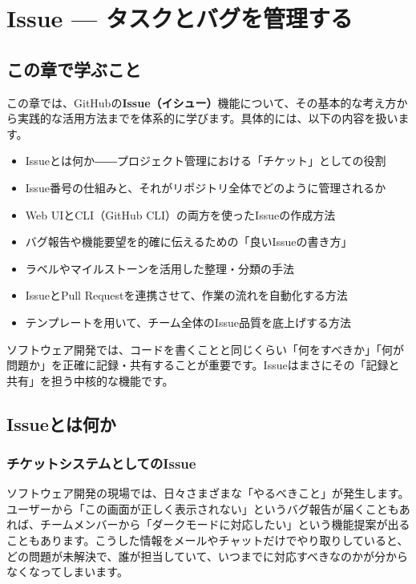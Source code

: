 \chapter{Issue --- タスクとバグを管理する}

\section{この章で学ぶこと}

この章では、GitHubの\textbf{Issue（イシュー）}機能について、その基本的な考え方から実践的な活用方法までを体系的に学びます。具体的には、以下の内容を扱います。

\begin{itemize}
  \item Issueとは何か――プロジェクト管理における「チケット」としての役割
  \item Issue番号の仕組みと、それがリポジトリ全体でどのように管理されるか
  \item Web UIとCLI（GitHub CLI）の両方を使ったIssueの作成方法
  \item バグ報告や機能要望を的確に伝えるための「良いIssueの書き方」
  \item ラベルやマイルストーンを活用した整理・分類の手法
  \item IssueとPull Requestを連携させて、作業の流れを自動化する方法
  \item テンプレートを用いて、チーム全体のIssue品質を底上げする方法
\end{itemize}

ソフトウェア開発では、コードを書くことと同じくらい「何をすべきか」「何が問題か」を正確に記録・共有することが重要です。Issueはまさにその「記録と共有」を担う中核的な機能です。

\section{Issueとは何か}

\subsection{チケットシステムとしてのIssue}

ソフトウェア開発の現場では、日々さまざまな「やるべきこと」が発生します。ユーザーから「この画面が正しく表示されない」というバグ報告が届くこともあれば、チームメンバーから「ダークモードに対応したい」という機能提案が出ることもあります。こうした情報をメールやチャットだけでやり取りしていると、どの問題が未解決で、誰が担当していて、いつまでに対応すべきなのかが分からなくなってしまいます。

